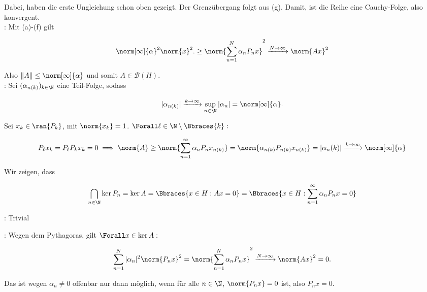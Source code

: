 \begin{solution}
Dabei, haben die erste Ungleichung schon oben gezeigt.
Der Grenzübergang folgt aus (g).
Damit, ist die Reihe eine Cauchy-Folge, also konvergent. \\

:
Mit (a)-(f) gilt

\begin{align*}
    \norm[\infty]{\alpha}^2 \norm{x}^2.
    \geq
    \norm{\sum_{n = 1}^N \alpha_n P_n x}^2
    \xrightarrow{N \to \infty}
    \norm{A x}^2
\end{align*}

Also $\|A\| \leq \norm[\infty]{\alpha}$ und somit $A \in \mathcal{B}(H)$. \\

:
Sei $(\alpha_{n(k)})_{k \in \N}$ eine Teil-Folge, sodass

\begin{align*}
  |\alpha_{n(k)}|
  \xrightarrow{k \to \infty}
  \sup_{n \in \N} |\alpha_n|
  =
  \norm[\infty]{\alpha}.
\end{align*}

Sei $x_k \in \ran{P_k}$, mit $\norm{x_k} = 1$.
$\Forall \ell \in \N \setminus \Bbraces{k}:$

\begin{align*}
  P_\ell x_k = P_\ell P_k x_k = 0
  \implies
  \norm{A}
  \geq
  \norm{\sum_{n=1}^\infty \alpha_n P_n x_{n(k)}}
  =
  \norm{\alpha_{n(k)} P_{n(k)} x_{n(k)}}
  =
  |\alpha_n(k)|
  \xrightarrow{k \to \infty}
  \norm[\infty]{\alpha}
\end{align*}

Wir zeigen, dass

\begin{align*}
  \bigcap_{n \in \N} \ker{P_n}
  =
  \ker{A}
  =
  \Bbraces{x \in H: A x = 0}
  =
  \Bbraces{x \in H: \sum_{n=1}^\infty \alpha_n P_n x = 0}
\end{align*}

\Quote{$\subseteq$}:
Trivial

\Quote{$\supseteq$}:
Wegen dem Pythagoras, gilt $\Forall x \in \ker{A}:$

\begin{align*}
    \sum_{n=1}^N |\alpha_n|^2 \norm{P_n x}^2
    =
    \norm{\sum_{n = 1}^N \alpha_n P_n x}^2
    \xrightarrow{N \rightarrow \infty}
    \norm{A x}^2 = 0.
\end{align*}

Das ist wegen $\alpha_n \neq 0$ offenbar nur dann möglich, wenn für alle $n \in \N$, $\norm{P_n x} = 0$ ist, also $P_n x = 0$. \\


\end{solution}
